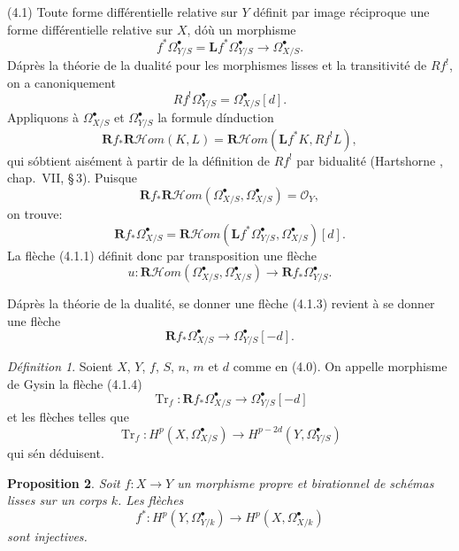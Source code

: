 \documentclass[12pt]{amsart}
\theoremstyle{plain}
\newtheorem{prop}{Proposition}[section]
\theoremstyle{remark}
\newtheorem{defn}[prop]{D\'efinition}
\DeclareMathOperator{\Tr}{Tr}
\newcommand{\cO}{\mathscr{O}}
\newcommand{\Rf}{\mathbf{R}f_*}
\newcommand{\Lf}{\mathbf{L}f^*}
\begin{document}
(4.1) Toute forme diff\'erentielle relative sur $Y$ d\'efinit par image r\'eciproque une forme diff\'erentielle relative sur $X$, d\'o\`u un morphisme
\begin{equation}\label{eq:4.1.1}
f^*\Omega_{Y/S}^\bullet = \Lf \Omega_{Y/S}^\bullet \longrightarrow \Omega_{X/S}^\bullet.
\end{equation}
D\'apr\`es la th\'eorie de la dualit\'e pour les morphismes lisses et la transitivit\'e de $R f^!$, on a canoniquement
\begin{equation}\label{eq:4.1.2}
R f^! \Omega_{Y/S}^\bullet = \Omega_{X/S}^\bullet[d].
\end{equation}
Appliquons \`a $\Omega_{X/S}^\bullet$ et $\Omega_{Y/S}^\bullet$ la formule d\'induction
\[
\Rf \mathbf{R}\mathscr{H}\!om(K, L) = \mathbf{R}\mathscr{H}\!om(\Lf K, R f^! L),
\]
qui s\'obtient ais\'ement \`a partir de la d\'efinition de $R f^!$ par bidualit\'e (Hartshorne \cite{Hartshorne}, chap.~VII, \S\,3). Puisque
\[
\Rf \mathbf{R}\mathscr{H}\!om(\Omega_{X/S}^\bullet, \Omega_{X/S}^\bullet) = \cO_Y,
\]
on trouve:
\[
\Rf \Omega_{X/S}^\bullet = \mathbf{R}\mathscr{H}\!om(\Lf \Omega_{Y/S}^\bullet, \Omega_{X/S}^\bullet)[d].
\]
La fl\`eche (4.1.1) d\'efinit donc par transposition une fl\`eche
\begin{equation}\label{eq:4.1.3}
u : \mathbf{R}\mathscr{H}\!om(\Omega_{X/S}^\bullet, \Omega_{X/S}^\bullet) \longrightarrow \Rf \Omega_{Y/S}^\bullet.
\end{equation}

D\'apr\`es la th\'eorie de la dualit\'e, se donner une fl\`eche (4.1.3) revient \`a se donner une fl\`eche
\begin{equation}\label{eq:4.1.4}
\Rf \Omega_{X/S}^\bullet \longrightarrow \Omega_{Y/S}^\bullet[-d].
\end{equation}

\begin{defn}\label{defn:4.2}
Soient $X$, $Y$, $f$, $S$, $n$, $m$ et $d$ comme en (4.0). On appelle morphisme de Gysin la fl\`eche (4.1.4)
\[
\Tr_f : \Rf \Omega_{X/S}^\bullet \longrightarrow \Omega_{Y/S}^\bullet[-d]
\]
et les fl\`eches telles que
\[
\Tr_f : H^p(X, \Omega_{X/S}^\bullet) \longrightarrow H^{p-2d}(Y, \Omega_{Y/S}^\bullet)
\]
qui s\'en d\'eduisent.
\end{defn}

\begin{prop}\label{prop:4.3}
Soit $f : X \to Y$ un morphisme propre et birationnel de sch\'emas lisses sur un corps $k$. Les fl\`eches
\[
f^* : H^p(Y, \Omega_{Y/k}^\bullet) \longrightarrow H^p(X, \Omega_{X/k}^\bullet)
\]
sont injectives.
\end{prop}
\end{document}
